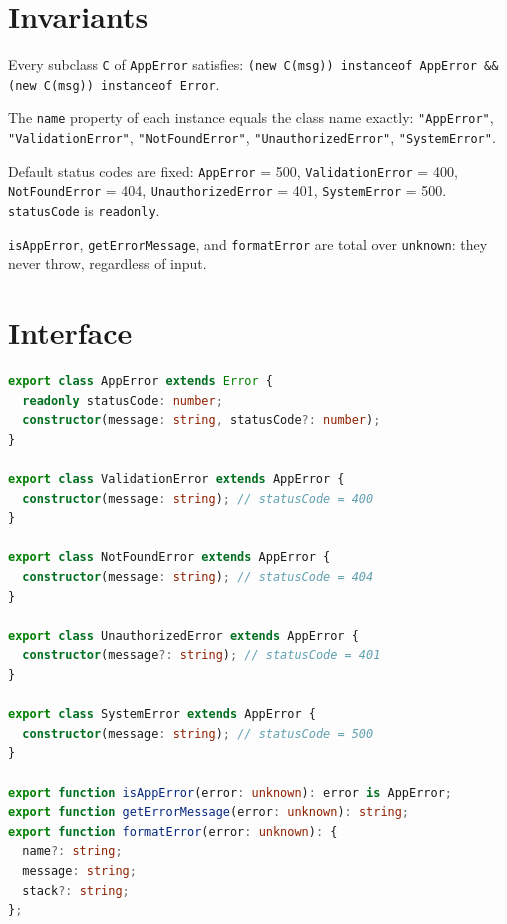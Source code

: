 \section{Invariants}
\begin{invariant}
Every subclass \texttt{C} of \texttt{AppError} satisfies: \texttt{(new C(msg)) instanceof AppError \&\& (new C(msg)) instanceof Error}.
\end{invariant}

\begin{invariant}
The \texttt{name} property of each instance equals the class name exactly: \texttt{"AppError"}, \texttt{"ValidationError"}, \texttt{"NotFoundError"}, \texttt{"UnauthorizedError"}, \texttt{"SystemError"}.
\end{invariant}

\begin{invariant}
Default status codes are fixed: \texttt{AppError} = 500, \texttt{ValidationError} = 400, \texttt{NotFoundError} = 404, \texttt{UnauthorizedError} = 401, \texttt{SystemError} = 500. \texttt{statusCode} is \texttt{readonly}.
\end{invariant}

\begin{invariant}
\texttt{isAppError}, \texttt{getErrorMessage}, and \texttt{formatError} are total over \texttt{unknown}: they never throw, regardless of input.
\end{invariant}

\section{Interface}

\begin{lstlisting}[language=TypeScript]
export class AppError extends Error {
  readonly statusCode: number;
  constructor(message: string, statusCode?: number);
}

export class ValidationError extends AppError {
  constructor(message: string); // statusCode = 400
}

export class NotFoundError extends AppError {
  constructor(message: string); // statusCode = 404
}

export class UnauthorizedError extends AppError {
  constructor(message?: string); // statusCode = 401
}

export class SystemError extends AppError {
  constructor(message: string); // statusCode = 500
}

export function isAppError(error: unknown): error is AppError;
export function getErrorMessage(error: unknown): string;
export function formatError(error: unknown): {
  name?: string;
  message: string;
  stack?: string;
};
\end{lstlisting}

